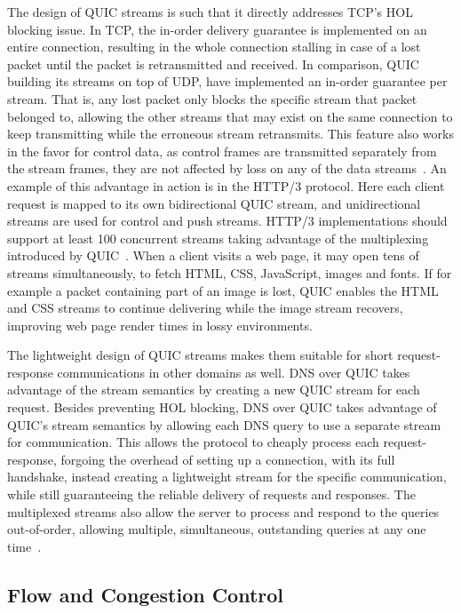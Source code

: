 \documentclass[english, 12pt, a4paper, elec, utf8, a-2b, online]{aaltothesis}
\begin{document}
The design of QUIC streams is such that it directly addresses TCP's HOL blocking
issue. In TCP, the in-order delivery guarantee is implemented on an entire connection,
resulting in the whole connection stalling in case of a lost packet until the packet is
retransmitted and received. In comparison, QUIC building its streams on top of
UDP, have implemented an in-order guarantee per stream. That is, any lost packet
only blocks the specific stream that packet belonged to, allowing the other streams
that may exist on the same connection to keep transmitting while the erroneous
stream retransmits. This feature also works in the favor for control data,
as control frames are transmitted separately from the stream frames, they are not
affected by loss on any of the data streams~\cite{rfc9000}. An example of this advantage
in action is in the HTTP/3 protocol. Here each client request is mapped to its own
bidirectional QUIC stream, and unidirectional streams are used for control and
push streams. HTTP/3 implementations should support at least 100 concurrent streams
taking advantage of the multiplexing introduced by QUIC~\cite{rfc9114}. When a client
visits a web page, it may open tens of streams simultaneously, to fetch HTML, CSS,
JavaScript, images and fonts. If for example a packet containing part of an image is lost, QUIC
enables the HTML and CSS streams to continue delivering while the image stream recovers,
improving web page render times in lossy environments.

The lightweight  design of QUIC streams makes them suitable for short request-response
communications in other domains as well. DNS over QUIC takes advantage of the
stream semantics by creating a new QUIC stream for each request. Besides preventing
HOL blocking, DNS over QUIC takes advantage of QUIC's stream semantics by allowing
each DNS query to use a separate stream for communication. This allows the protocol
to cheaply process each request-response, forgoing the overhead of setting up a connection,
with its full handshake, instead creating a lightweight stream for the specific
communication, while still guaranteeing the reliable delivery of requests and responses.
The multiplexed streams also allow the server to process and respond to the queries
out-of-order, allowing multiple, simultaneous, outstanding queries at any one time~\cite{rfc9250}.

\subsection{Flow and Congestion Control}
\end{document}
